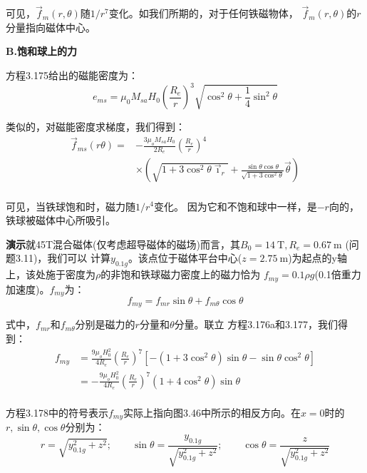 可见，$\vec{f}_{m}(r,\theta)$随$1/r^7$变化。如我们所期的，对于任何铁磁物体，
$\vec{f}_{m}(r,\theta)$的$r$分量指向磁体中心。

\textbf{B.饱和球上的力}

方程3.175给出的磁能密度为：
\begin{equation*}
e_{ms}=\mu_0 M_{sa}H_0(\frac{R_e}{r})^3\sqrt{\cos^2\theta+\frac{1}{4}\sin^2\theta}
\end{equation*}

类似的，对磁能密度求梯度，我们得到：
\begin{equation*}
\begin{split}
\vec{f}_{ms}(r\theta)=&-\frac{3\mu_{o}M_{sa}H_{0}}{2R_{e}}(\frac{R_{e}}{r})^{4}\\
&\times(\sqrt{1+3\cos^{2}\theta\vec{\imath}_{r}}+\frac{\sin\theta\cos\theta}{\sqrt{1+3\cos^{2}\theta}}\vec{\theta})\\%
\end{split} \tag{3.176b}
\end{equation*}

可见，当铁球饱和时，磁力随$1/r^4$变化。
因为它和不饱和球中一样，是$-r$向的，铁球被磁体中心所吸引。

\textbf{演示}\quad 就45T混合磁体(仅考虑超导磁体的磁场)而言，其$B_0 = 14\ \mathrm{T},R_e = 0.67\ \mathrm{m}$ (问题3.11)，我们可以
计算$y_{0.1g}$。该点位于磁体平台中心($z=2.75\ \mathrm{m}$)为起点的y轴上，该处施于密度为$\rho$的非饱和铁球磁力密度上的磁力恰为
$f_{my}=0.1\rho g$(0.1倍重力加速度)。$f_{my}$为：
\begin{equation}
f_{my}=f_{mr}\sin\theta+f_{m\theta}\cos\theta%
\end{equation}

式中，$f_{mr}$和$f_{m\theta}$分别是磁力的$r$分量和$\theta$分量。联立
方程3.176a和3.177，我们得到：
\begin{equation}
\begin{split}
f_{my}&=\frac{9\mu_{o}H_{0}^{2}}{4R_{e}}(\frac{R_{e}}{r})^{7}[-(1+3\cos^{2}\theta)\sin\theta-\sin\theta\cos^{2}\theta]\\
&=-\frac{9\mu_{o}H_{0}^{2}}{4R_{e}}(\frac{R_{e}}{r})^{7}(1+4\cos^{2}\theta)\sin\theta\\%
\end{split}
\end{equation}

方程3.178中的符号表示$f_{my}$实际上指向图3.46中所示的相反方向。在$x=0$时的$r,\sin\theta,\cos\theta$分别为：
\begin{equation*}
r=\sqrt{y_{0.1g}^2+z^2};\qquad \sin\theta=\frac{y_{0.1g}}{\sqrt{y_{0.1g}^2+z^2}};\qquad \cos\theta=\frac{z}{\sqrt{y_{0.1g}^2+z^2}}
\end{equation*}

